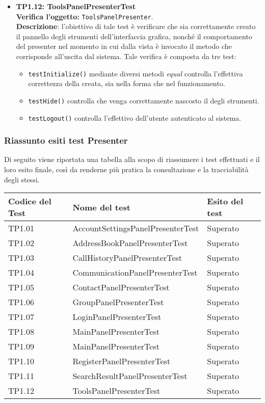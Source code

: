 \begin{itemize}
\item \textbf{TP1.12: ToolsPanelPresenterTest}\\
\textbf{Verifica l'oggetto:} \texttt{ToolsPanelPresenter}.\\
\textbf{Descrizione}: l'obiettivo di tale test è verificare che sia correttamente creato il pannello degli strumenti dell'interfaccia grafica, nonché il comportamento del presenter nel momento in cui dalla vista è invocato il metodo che corrisponde all'uscita dal sistema.
Tale verifica è composta da tre test:
\begin{itemize}
\item \texttt{testInitialize()} mediante diversi metodi \textit{equal} controlla l'effettiva correttezza della  creata, sia nella forma che nel funzionamento.
\item \texttt{testHide()} controlla che venga correttamente nascosto il  degli strumenti.
\item \texttt{testLogout()} controlla l'effettivo  dell'utente autenticato al sistema.
\end{itemize}
\clearpage
\end{itemize}

\subsubsection{Riassunto esiti test Presenter}
Di seguito viene riportata una tabella alla scopo di riassumere i test effettuati e il loro esito finale, così da renderne più pratica la consultazione e la tracciabilità degli stessi.

\begin{center}
\begin{longtable}{p{}ll}
\toprule Codice del Test & Nome del test  & Esito del test\\
\midrule

TP1.01 & AccountSettingsPanelPresenterTest &Superato\\
TP1.02 & AddressBookPanelPresenterTest &Superato\\
TP1.03 & CallHistoryPanelPresenterTest &Superato\\
TP1.04 & CommunicationPanelPresenterTest &Superato\\
TP1.05 & ContactPanelPresenterTest &Superato\\
TP1.06 & GroupPanelPresenterTest &Superato\\
TP1.07 & LoginPanelPresenterTest &Superato\\
TP1.08 & MainPanelPresenterTest &Superato\\
TP1.09 & MainPanelPresenterTest &Superato\\
TP1.10 & RegisterPanelPresenterTest &Superato\\
TP1.11 & SearchResultPanelPresenterTest &Superato\\
TP1.12 & ToolsPanelPresenterTest &Superato\\

\bottomrule
\end{longtable}
\end{center}

